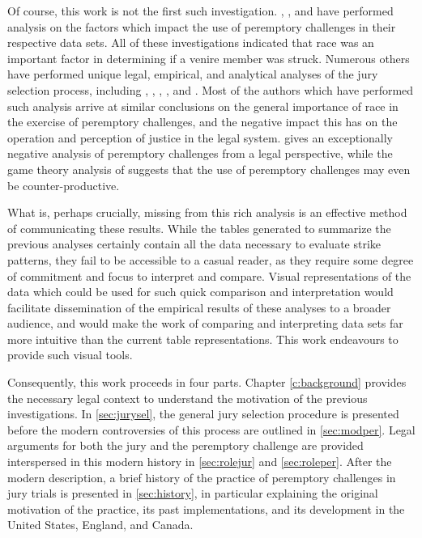 Of course, this work is not the first such investigation. \cite{JurySunshineProj}, \cite{StubbornLegacy}, and
\cite{PerempChalMurder} have performed analysis on the factors which
impact the use of peremptory challenges in their respective data
sets. All of these
investigations indicated that race was an important factor in
determining if a venire member was struck. Numerous others have
performed unique legal, empirical, and analytical analyses of the jury
selection process, including
\cite{hoffman1997}, \cite{vandykejurysel}, \cite{hansvidjudging}, \cite{brown1978}, and \cite{ford2010}. Most of the authors which have
performed such analysis arrive at similar conclusions on the general importance of race in the exercise of peremptory challenges,
and the negative impact this has on the operation and perception of justice in the legal system. \cite{hoffman1997} gives an
exceptionally negative analysis of peremptory challenges from a legal perspective, while the game theory analysis of
\cite{ford2010} suggests that the use of peremptory challenges may even be counter-productive.

What is, perhaps crucially, missing from this rich analysis is an effective method of communicating these results. While the
tables generated to summarize the previous analyses certainly contain
all the data necessary to evaluate strike patterns, they fail
to be accessible to a casual reader, as they require some degree of commitment and focus to interpret and compare. Visual
representations of the data which could be used for such quick
comparison and interpretation would facilitate dissemination of
the empirical results of these analyses to a broader audience, and would make the work of comparing and interpreting data sets far
more intuitive than the current table representations. This work endeavours to provide such visual tools.

Consequently, this work proceeds in four parts. Chapter \ref{c:background} provides the necessary legal context to understand the
motivation of the previous investigations. In \ref{sec:jurysel}, the general jury selection procedure is presented before the
modern controversies of this process are outlined in \ref{sec:modper}. Legal arguments for both the jury and the peremptory
challenge are provided interspersed in this modern history in \ref{sec:rolejur} and \ref{sec:roleper}. After the modern
description, a brief history of the practice of peremptory challenges in jury trials is presented in \ref{sec:history}, in
particular explaining the original motivation of the practice, its past implementations, and its development in the United States,
England, and Canada.

